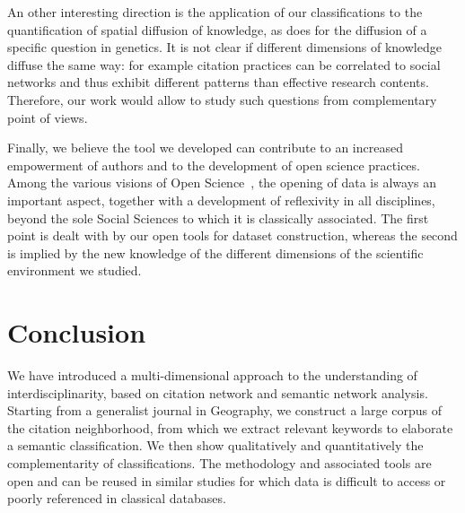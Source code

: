 An other interesting direction is the application of our classifications to the quantification of spatial diffusion of knowledge, as \cite{maisonobe2013diffusion} does for the diffusion of a specific question in genetics. It is not clear if different dimensions of knowledge diffuse the same way: for example citation practices can be correlated to social networks and thus exhibit different patterns than effective research contents. Therefore, our work would allow to study such questions from complementary point of views.



Finally, we believe the tool we developed can contribute to an increased empowerment of authors and to the development of open science practices. Among the various visions of Open Science~\citep{fecher2014open}, the opening of data is always an important aspect, together with a development of reflexivity in all disciplines, beyond the sole Social Sciences to which it is classically associated. The first point is dealt with by our open tools for dataset construction, whereas the second is implied by the new knowledge of the different dimensions of the scientific environment we studied.










\section*{Conclusion}
\label{sec:discussion}


We have introduced a multi-dimensional approach to the understanding of interdisciplinarity, based on citation network and semantic network analysis. Starting from a generalist journal in Geography, we construct a large corpus of the citation neighborhood, from which we extract relevant keywords to elaborate a semantic classification. We then show qualitatively and quantitatively the complementarity of classifications. The methodology and associated tools are open and can be reused in similar studies for which data is difficult to access or poorly referenced in classical databases.




